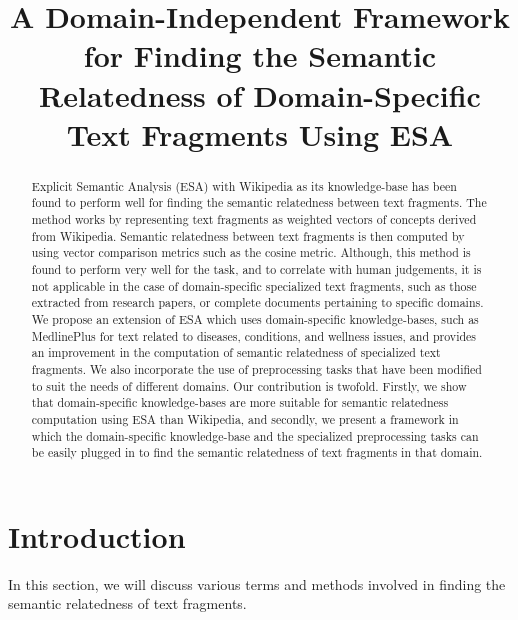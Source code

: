 \documentclass[conference]{IEEEtran}
\begin{document}
\title{A Domain-Independent Framework for Finding the Semantic Relatedness of Domain-Specific Text Fragments Using ESA}

\author{
}

\maketitle

\begin{abstract}
Explicit Semantic Analysis (ESA) with Wikipedia as its knowledge-base has been found to perform well for finding the semantic relatedness between text fragments. The method works by representing text fragments as weighted vectors of concepts derived from Wikipedia. Semantic relatedness between text fragments is then computed by using vector comparison metrics such as the cosine metric. Although, this method is found to perform very well for the task, and to correlate with human judgements, it is not applicable in the case of domain-specific specialized text fragments, such as those extracted from research papers, or complete documents pertaining to specific domains. We propose an extension of ESA which uses domain-specific knowledge-bases, such as MedlinePlus for text related to diseases, conditions, and wellness issues, and provides an improvement in the computation of semantic relatedness of specialized text fragments. We also incorporate the use of preprocessing tasks that have been modified to suit the needs of different domains. Our contribution is twofold. Firstly, we show that domain-specific knowledge-bases are more suitable for semantic relatedness computation using ESA than Wikipedia, and secondly, we present a framework in which the domain-specific knowledge-base and the specialized preprocessing tasks can be easily plugged in to find the semantic relatedness of text fragments in that domain.
\end{abstract}

\section{Introduction}
In this section, we will discuss various terms and methods involved in finding the semantic relatedness of text fragments.
\end{document}
